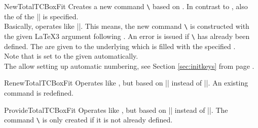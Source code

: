 \clearpage

\begin{docCommand}{NewTotalTCBoxFit}{}
  Creates a new command \texttt{\textbackslash} based on .
  In contrast to , also the  of the |\tcboxfit| is specified.\\
  Basically,  operates like |\NewDocumentCommand|. This means,
  the new command \texttt{\textbackslash} is constructed with the given
  \LaTeX3 argument  following \cite{latexproject:usrguide}.
  An error is issued if \texttt{\textbackslash} has already been defined.
  The  are given to the underlying  which is filled with
  the specified .\\
  Note that  is set to the given 
  automatically.\\
  The  allow setting up automatic numbering,
  see Section \ref{sec:initkeys} from page \pageref{sec:initkeys}.

\end{docCommand}

\begin{docCommand}{RenewTotalTCBoxFit}{}
  Operates like , but based on |\RenewDocumentCommand| instead of |\NewDocumentCommand|.
  An existing command is redefined.
\end{docCommand}

\begin{docCommand}{ProvideTotalTCBoxFit}{}
  Operates like , but based on |\ProvideDocumentCommand| instead of |\NewDocumentCommand|.
  The command \texttt{\textbackslash} is only created if it is not already defined.
\end{docCommand}

